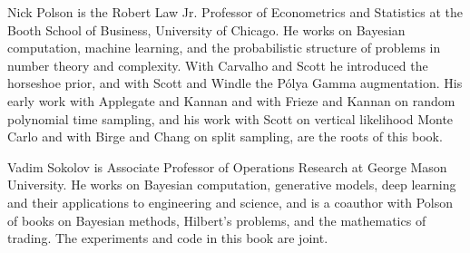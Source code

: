 \documentclass[11pt,twoside,openany]{book}
\theoremstyle{plain}
\theoremstyle{definition}
\theoremstyle{remark}
\begin{document}
Nick Polson is the Robert Law Jr. Professor of Econometrics and Statistics at the Booth School of Business, University of Chicago. He works on Bayesian computation, machine learning, and the probabilistic structure of problems in number theory and complexity. With Carvalho and Scott he introduced the horseshoe prior, and with Scott and Windle the P\'olya Gamma augmentation. His early work with Applegate and Kannan and with Frieze and Kannan on random polynomial time sampling, and his work with Scott on vertical likelihood Monte Carlo and with Birge and Chang on split sampling, are the roots of this book.

Vadim Sokolov is Associate Professor of Operations Research at George Mason University. He works on Bayesian computation, generative models, deep learning and their applications to engineering and science, and is a coauthor with Polson of books on Bayesian methods, Hilbert's problems, and the mathematics of trading. The experiments and code in this book are joint.

\clearpage
\end{document}
